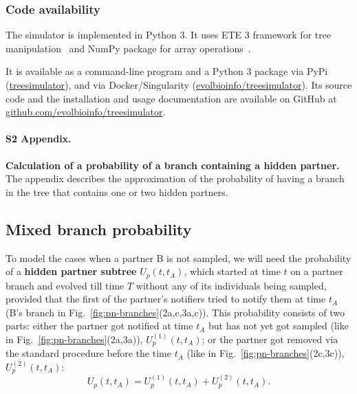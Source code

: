 \documentclass[10pt,letterpaper]{article}
\begin{document}
\subsubsection*{Code availability}
The simulator is implemented in Python 3. It uses ETE 3 framework for tree manipulation~\cite{Huerta-Cepas2016} and NumPy package for array operations~\cite{harris_array_2020}. 

It is available as a command-line program and a Python 3 package via PyPi (\href{https://pypi.org/project/treesimulator}{treesimulator}), and via Docker/Singularity (\href{https://hub.docker.com/r/evolbioinfo/treesimulator/tags}{evolbioinfo/treesimulator}). Its source code and the installation and usage documentation are available on GitHub at \href{https://github.com/evolbioinfo/treesimulator}{github.com/evolbioinfo/treesimulator}.


\paragraph*{S2 Appendix.}
\label{S2_Appendix}
{\bf Calculation of a probability of a branch containing a hidden partner.} The appendix describes the approximation of the probability of having a branch in the tree that contains one or two hidden partners.

\subsection*{Mixed branch probability}


To model the cases when a partner B is not sampled, we will need the probability of a \textbf{hidden partner subtree} $U_p(t, t_A)$, which started at time $t$ on a partner branch and evolved till time $T$ without any of its individuals being sampled, provided that the first of the partner's notifiers tried to notify them at time $t_A$ (B's branch in Fig.~\ref{fig:pn-branches}(2a,c,3a,c)). This probability consists of two parts: either the partner got notified at time $t_A$ but has not yet got sampled (like in Fig.~\ref{fig:pn-branches}(2a,3a)), $U_p^{(1)}(t, t_A)$;  or the partner got removed via the standard procedure before the time $t_A$ (like in Fig.~\ref{fig:pn-branches}(2c,3c)), $U_p^{(2)}(t, t_A)$: 
\begin{equation}
U_p(t, t_A) = U_p^{(1)}(t, t_A) + U_p^{(2)}(t, t_A).
\end{equation} 
\end{document}
